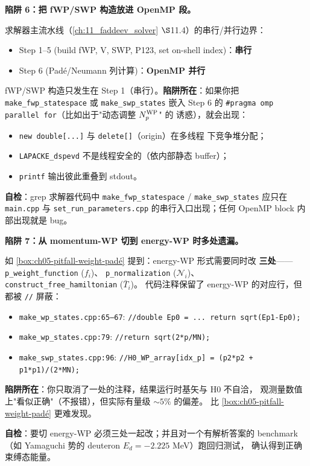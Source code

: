 \begin{pitfallbox}[label={box:ch06-pitfall-omp}]
\textbf{陷阱 6：把 fWP/SWP 构造放进 OpenMP 段。}

求解器主流水线（\cref{ch:11_faddeev_solver} \(\S\)11.4）的串行/并行边界：
\begin{itemize}
  \item Step 1--5 (build fWP, V, SWP, P123, set on-shell index)：\textbf{串行}
  \item Step 6 (Padé/Neumann 列计算)：\textbf{OpenMP 并行}
\end{itemize}
fWP/SWP 构造只发生在 Step 1（串行）。\textbf{陷阱所在}：如果你把
\texttt{make\_fwp\_statespace} 或 \texttt{make\_swp\_states} 嵌入 Step 6
的 \texttt{\#pragma omp parallel for}（比如出于"动态调整 \({N_{p}^{\text{WP}}}\)" 的
诱惑），就会出现：
\begin{itemize}
  \item \texttt{new double[...]} 与 \texttt{delete[]}（origin）在多线程
        下竞争堆分配；
  \item \texttt{LAPACKE\_dspevd} 不是线程安全的（依内部静态 buffer）；
  \item \texttt{printf} 输出彼此重叠到 stdout。
\end{itemize}
\textbf{自检}：grep 求解器代码中 \texttt{make\_fwp\_statespace} /
\texttt{make\_swp\_states} 应只在 \texttt{main.cpp} 与
\texttt{set\_run\_parameters.cpp} 的串行入口出现；任何 OpenMP block 内
部出现就是 bug。
\end{pitfallbox}

\begin{pitfallbox}[label={box:ch06-pitfall-energy-WP}]
\textbf{陷阱 7：从 momentum-WP 切到 energy-WP 时多处遗漏。}

如 \cref{box:ch05-pitfall-weight-padé} 提到：energy-WP 形式需要同时改
\textbf{三处}——\texttt{p\_weight\_function} (\(f_i\))、
\texttt{p\_normalization} (\(\mathcal{N}_i\))、
\texttt{construct\_free\_hamiltonian} (\(\bar{T}_i\))。
代码注释保留了 energy-WP 的对应行，但都被 \texttt{//} 屏蔽：
\begin{itemize}
  \item \texttt{make\_wp\_states.cpp:65--67}: \texttt{//double Ep0 = ...
        return sqrt(Ep1-Ep0);}
  \item \texttt{make\_wp\_states.cpp:79}: \texttt{//return sqrt(2*p/MN);}
  \item \texttt{make\_swp\_states.cpp:96}: \texttt{//H0\_WP\_array[idx\_p]
        = (p2*p2 + p1*p1)/(2*MN);}
\end{itemize}
\textbf{陷阱所在}：你只取消了一处的注释，结果运行时基矢与 H0 不自洽，
观测量数值上"看似正确"（不报错），但实际有量级 \(\sim 5\%\) 的偏差。
比 \cref{box:ch05-pitfall-weight-padé} 更难发现。

\textbf{自检}：要切 energy-WP 必须三处一起改；并且对一个有解析答案的
benchmark（如 Yamaguchi 势的 deuteron \(E_d = -2.225\) MeV）跑回归测试，
确认得到正确束缚态能量。
\end{pitfallbox}
